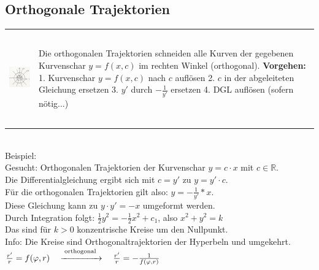 \subsection{Orthogonale Trajektorien}
\begin{tabular}{ll}
\parbox{4.5cm}{
\includegraphics[height=4cm]{./bilder/orthoTrajekt.png}
}
& 
\parbox{14.5cm}{
Die orthogonalen Trajektorien schneiden alle Kurven der gegebenen Kurvenschar
$y=f(x,c)$ im rechten Winkel (orthogonal).\\
\textbf{Vorgehen:} \\
1. Kurvenschar $y=f(x,c)$ nach $c$ auflösen\\
2. $c$ in der abgeleiteten Gleichung ersetzen\\
3. $y'$ durch $-\frac{1}{y'}$ ersetzen\\
4. DGL auflösen (sofern nötig...)
}
\end{tabular}
\newline
\vspace{0.50cm}\\
Beispiel:\\
Gesucht: Orthogonalen Trajektorien der Kurvenschar $y=c \cdot x$ mit $c \in \mathbb{R}.$\\
Die Differentialgleichung ergibt sich mit $c=y'$ zu $y=y' \cdot c.$\\
Für die orthogonalen Trajektorien gilt also: $y=-\frac{1}{y'}*x.$\\
Diese Gleichung kann zu $y \cdot y'=-x$ umgeformt werden.\\
Durch Integration folgt: $\frac{1}{2} y^{2}=-\frac{1}{2} x^{2}+c_{1}$, also $x^{2}+y^{2}=k$\\
Das sind für $k>0$ konzentrische Kreise um den Nullpunkt.\\
\newline
Info: Die Kreise sind Orthogonaltrajektorien der Hyperbeln und umgekehrt.\\
$\frac{r^{\prime}}{r}=f(\varphi, r) \quad \stackrel{\text {orthogonal }}{\xrightarrow{\hspace{1.5cm}}} \quad \frac{r^{\prime}}{r}=-\frac{1}{f(\varphi, r)}$\\


